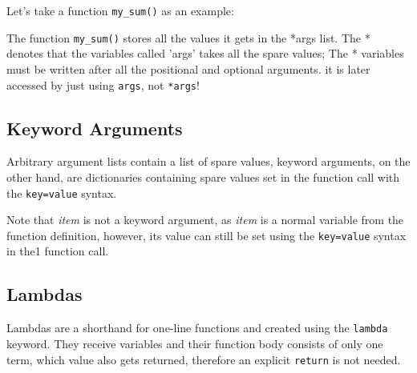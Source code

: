     Let's take a function \texttt{my_sum()} as an example:


    The function \texttt{my_sum()} stores all the values it gets in the *args list.
    The * denotes that the variables called 'args' takes all the spare values; The * variables must
    be written after all the positional and optional arguments.
    it is later accessed by just using \texttt{args}, not \texttt{*args}!
  
  \subsection{Keyword Arguments}
    Arbitrary argument lists contain a list of spare values, keyword arguments, on the other hand,
    are dictionaries containing spare values set in the function call with the
    \texttt{key=value} syntax.


    Note that \textit{item} is not a keyword argument, as \textit{item} is a normal variable
    from the function definition, however, its value can still be set using the
    \texttt{key=value} syntax in the1 function call.
    

  
  \subsection{Lambdas}
    Lambdas are a shorthand for one-line functions and created using the
    \texttt{lambda} keyword. They receive variables and their function body consists
    of only one term, which value also gets returned, therefore an explicit
    \texttt{return} is not needed.

